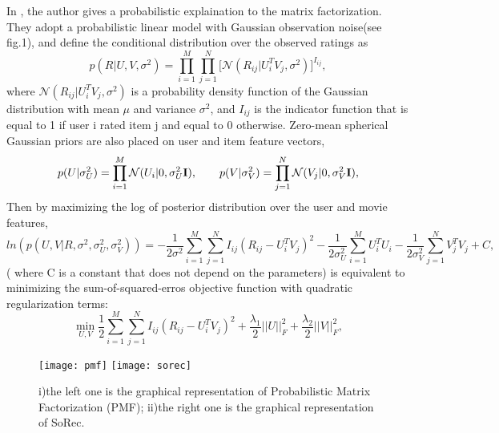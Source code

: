 In \cite{mnih2007probabilistic}, the author gives a probabilistic explaination to the matrix factorization. They adopt a probabilistic linear model with Gaussian observation noise(see fig.1), and define the conditional distribution over the observed ratings as
\begin{equation}
p(R|U,V,\sigma^2) = \prod_{i=1}^{M}\prod_{j=1}^{N}\big[\mathcal{N}(R_{ij}|U_i^TV_j,\sigma^2)\big]^{I_{ij}},
\end{equation} 
where $\mathcal{N}(R_{ij}|U_i^TV_j,\sigma^2)$ is a probability density function of the Gaussian distribution with mean $\mu$ and variance $\sigma^2$, and $I_{ij}$ is the indicator function that is equal to 1 if user i rated item j and equal to 0 otherwise. Zero-mean spherical Gaussian priors are also placed on user and item feature vectors, 
\begin{equation}
p(U|\sigma_U^2) = \prod_{i=1}^{M}\mathcal{N}(U_{i}|0,\sigma_U^2\bold{I}),\quad\quad
p(V|\sigma_V^2) = \prod_{j=1}^{N}\mathcal{N}(V_{j}|0,\sigma_V^2\bold{I}),
\end{equation} 
Then by maximizing the log of posterior distribution over the user and movie features,
\begin{equation}
ln(p(U,V|R, \sigma^2,\sigma_U^2,\sigma_V^2)) = -\frac{1}{2\sigma^2}\sum_{i=1}^{M}\sum_{j=1}^{N}I_{ij}(R_{ij} - U_i^TV_j)^2 - \frac{1}{2\sigma_U^2}\sum_{i=1}^{M}U_i^TU_i - \frac{1}{2\sigma_V^2}\sum_{j=1}^{N}V_j^TV_j + C,
\end{equation} 
( where C is a constant that does not depend on the parameters) is equivalent to minimizing the sum-of-squared-erros objective function with quadratic regularization terms:
\begin{equation}
\min_{U,V}\frac{1}{2}\sum_{i=1}^{M}\sum_{j=1}^{N}I_{ij}(R_{ij} - U_i^TV_j)^2 + \frac{\lambda_1}{2}||U||_F^2 + \frac{\lambda_2}{2}||V||_F^2,
\end{equation} 
\begin{figure}[h]
	\caption{i)the left one is the graphical representation of Probabilistic Matrix Factorization (PMF); ii)the right one is the graphical representation of SoRec.}
	\centering
	\texttt{[image: pmf]}
	\texttt{[image: sorec]}
\end{figure}

